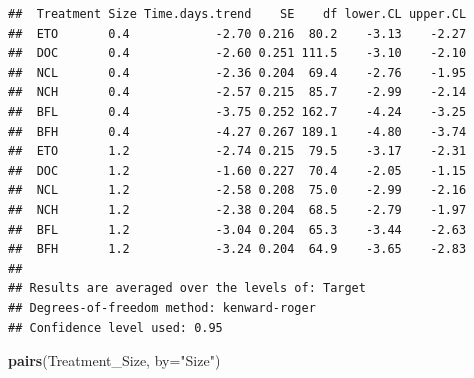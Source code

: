 \documentclass[
]{article}
\newenvironment{Shaded}{\begin{snugshade}}{\end{snugshade}}
\newcommand{\AttributeTok}[1]{\textcolor[rgb]{0.13,0.29,0.53}{#1}}
\newcommand{\FunctionTok}[1]{\textcolor[rgb]{0.13,0.29,0.53}{\textbf{#1}}}
\newcommand{\NormalTok}[1]{#1}
\newcommand{\StringTok}[1]{\textcolor[rgb]{0.31,0.60,0.02}{#1}}
\begin{document}
\begin{verbatim}
##  Treatment Size Time.days.trend    SE    df lower.CL upper.CL
##  ETO       0.4            -2.70 0.216  80.2    -3.13    -2.27
##  DOC       0.4            -2.60 0.251 111.5    -3.10    -2.10
##  NCL       0.4            -2.36 0.204  69.4    -2.76    -1.95
##  NCH       0.4            -2.57 0.215  85.7    -2.99    -2.14
##  BFL       0.4            -3.75 0.252 162.7    -4.24    -3.25
##  BFH       0.4            -4.27 0.267 189.1    -4.80    -3.74
##  ETO       1.2            -2.74 0.215  79.5    -3.17    -2.31
##  DOC       1.2            -1.60 0.227  70.4    -2.05    -1.15
##  NCL       1.2            -2.58 0.208  75.0    -2.99    -2.16
##  NCH       1.2            -2.38 0.204  68.5    -2.79    -1.97
##  BFL       1.2            -3.04 0.204  65.3    -3.44    -2.63
##  BFH       1.2            -3.24 0.204  64.9    -3.65    -2.83
## 
## Results are averaged over the levels of: Target 
## Degrees-of-freedom method: kenward-roger 
## Confidence level used: 0.95
\end{verbatim}

\begin{Shaded}
\begin{Highlighting}[]
\FunctionTok{pairs}\NormalTok{(Treatment\_Size, }\AttributeTok{by=}\StringTok{"Size"}\NormalTok{)}
\end{Highlighting}
\end{Shaded}
\end{document}
